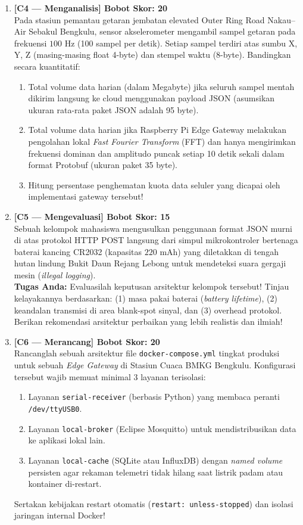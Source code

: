 \documentclass[11pt,a4paper]{article}
\begin{document}
\begin{enumerate}
    \item \textbf{[C4 --- Menganalisis] Bobot Skor: 20}\\
    Pada stasiun pemantau getaran jembatan elevated Outer Ring Road Nakau--Air Sebakul Bengkulu, sensor akselerometer mengambil sampel getaran pada frekuensi $100\text{ Hz}$ (100 sampel per detik). Setiap sampel terdiri atas sumbu X, Y, Z (masing-masing float 4-byte) dan stempel waktu (8-byte). Bandingkan secara kuantitatif:
    \begin{enumerate}[label=(\alph*)]
        \item Total volume data harian (dalam Megabyte) jika seluruh sampel mentah dikirim langsung ke cloud menggunakan payload JSON (asumsikan ukuran rata-rata paket JSON adalah 95 byte).
        \item Total volume data harian jika Raspberry Pi Edge Gateway melakukan pengolahan lokal \textit{Fast Fourier Transform} (FFT) dan hanya mengirimkan frekuensi dominan dan amplitudo puncak setiap 10 detik sekali dalam format Protobuf (ukuran paket 35 byte).
        \item Hitung persentase penghematan kuota data seluler yang dicapai oleh implementasi gateway tersebut!
    \end{enumerate}

    \item \textbf{[C5 --- Mengevaluasi] Bobot Skor: 15}\\
    Sebuah kelompok mahasiswa mengusulkan penggunaan format JSON murni di atas protokol HTTP POST langsung dari simpul mikrokontroler bertenaga baterai kancing CR2032 (kapasitas $220\text{ mAh}$) yang diletakkan di tengah hutan lindung Bukit Daun Rejang Lebong untuk mendeteksi suara gergaji mesin (\textit{illegal logging}).\\
    \textbf{Tugas Anda:} Evaluasilah keputusan arsitektur kelompok tersebut! Tinjau kelayakannya berdasarkan: (1) masa pakai baterai (\textit{battery lifetime}), (2) keandalan transmisi di area blank-spot sinyal, dan (3) overhead protokol. Berikan rekomendasi arsitektur perbaikan yang lebih realistis dan ilmiah!

    \item \textbf{[C6 --- Merancang] Bobot Skor: 20}\\
    Rancanglah sebuah arsitektur file \texttt{docker-compose.yml} tingkat produksi untuk sebuah \textit{Edge Gateway} di Stasiun Cuaca BMKG Bengkulu. Konfigurasi tersebut wajib memuat minimal 3 layanan terisolasi:
    \begin{enumerate}[label=(\alph*)]
        \item Layanan \texttt{serial-receiver} (berbasis Python) yang membaca peranti \texttt{/dev/ttyUSB0}.
        \item Layanan \texttt{local-broker} (Eclipse Mosquitto) untuk mendistribusikan data ke aplikasi lokal lain.
        \item Layanan \texttt{local-cache} (SQLite atau InfluxDB) dengan \textit{named volume} persisten agar rekaman telemetri tidak hilang saat listrik padam atau kontainer di-restart.
    \end{enumerate}
    Sertakan kebijakan restart otomatis (\texttt{restart: unless-stopped}) dan isolasi jaringan internal Docker!
\end{enumerate}
\end{document}

